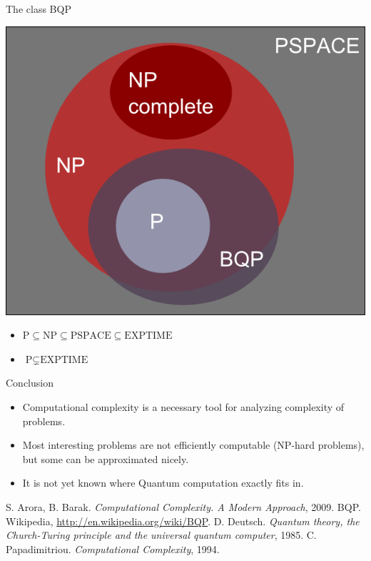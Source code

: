\documentclass[c]{beamer}
\begin{document}
\begin{frame}{The class BQP}

\begin{center}
\includegraphics[scale=0.20]{images/classes.png} 	
\end{center}

\begin{itemize}
\item $\mbox{P} \subseteq \mbox{NP}  \subseteq \mbox{PSPACE} \subseteq \mbox{EXPTIME} $

\item $\mbox{P} \subsetneq \mbox{EXPTIME}$
	\end{itemize}
	
\end{frame}

\begin{frame}{Conclusion}
	\begin{itemize}
		\item Computational complexity is a necessary tool for analyzing complexity of problems.
		\item Most interesting problems are not efficiently computable (NP-hard problems), but some can be approximated nicely.
		\item It is not yet known where Quantum computation exactly fits in.
	\end{itemize}
\end{frame}

\begin{thebibliography}{n}
	 S. Arora, B. Barak. \emph{Computational Complexity. A Modern 
Approach}, 2009.
	 BQP. Wikipedia, \url{http://en.wikipedia.org/wiki/BQP}.
	 D. Deutsch. \emph{Quantum theory, the Church-Turing principle and the universal quantum computer}, 1985.
	 C. Papadimitriou. \emph{Computational Complexity}, 1994.
\end{thebibliography}
\end{document}
